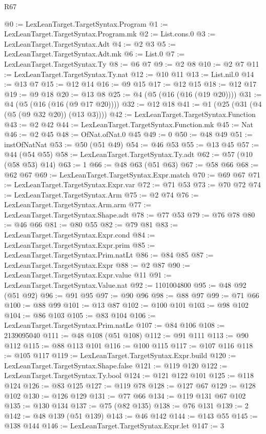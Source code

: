 \begin{lexlean}{R67}
\begin{coremodule}
@0 := LexLeanTarget.TargetSyntax.Program
@1 := LexLeanTarget.TargetSyntax.Program.mk
@2 := List.cons.{0}
@3 := LexLeanTarget.TargetSyntax.Adt
@4 := @2 @3
@5 := LexLeanTarget.TargetSyntax.Adt.mk
@6 := List.{0}
@7 := LexLeanTarget.TargetSyntax.Ty
@8 := @6 @7
@9 := @2 @8
@10 := @2 @7
@11 := LexLeanTarget.TargetSyntax.Ty.nat
@12 := @10 @11
@13 := List.nil.{0}
@14 := @13 @7
@15 := @12 @14
@16 := @9 @15
@17 := @12 @15
@18 := @12 @17
@19 := @9 @18
@20 := @13 @8
@25 := @4 (@5 (@16 (@16 (@19 @20))))
@31 := @4 (@5 (@16 (@16 (@9 @17 @20))))
@32 := @12 @18
@41 := @1 (@25 (@31 (@4 (@5 (@9 @32 @20)) (@13 @3))))
@42 := LexLeanTarget.TargetSyntax.Function
@43 := @2 @42
@44 := LexLeanTarget.TargetSyntax.Function.mk
@45 := Nat
@46 := @2 @45
@48 := OfNat.ofNat.{0} @45
@49 := 0
@50 := @48 @49
@51 := instOfNatNat
@53 := @50 (@51 @49)
@54 := @46 @53
@55 := @13 @45
@57 := @44 (@54 @55)
@58 := LexLeanTarget.TargetSyntax.Ty.adt
@62 := @57 (@10 (@58 @53) @14)
@63 := 1
@66 := @48 @63 (@51 @63)
@67 := @58 @66
@68 := @62 @67
@69 := LexLeanTarget.TargetSyntax.Expr.match
@70 := @69 @67
@71 := LexLeanTarget.TargetSyntax.Expr.var
@72 := @71 @53
@73 := @70 @72
@74 := LexLeanTarget.TargetSyntax.Arm
@75 := @2 @74
@76 := LexLeanTarget.TargetSyntax.Arm.arm
@77 := LexLeanTarget.TargetSyntax.Shape.adt
@78 := @77 @53
@79 := @76 @78
@80 := @46 @66
@81 := @80 @55
@82 := @79 @81
@83 := LexLeanTarget.TargetSyntax.Expr.cond
@84 := LexLeanTarget.TargetSyntax.Expr.prim
@85 := LexLeanTarget.TargetSyntax.Prim.natLt
@86 := @84 @85
@87 := LexLeanTarget.TargetSyntax.Expr
@88 := @2 @87
@90 := LexLeanTarget.TargetSyntax.Expr.value @11
@91 := LexLeanTarget.TargetSyntax.Value.nat
@92 := 1101004800
@95 := @48 @92 (@51 @92)
@96 := @91 @95
@97 := @90 @96
@98 := @88 @97
@99 := @71 @66
@100 := @88 @99
@101 := @13 @87
@102 := @100 @101
@103 := @98 @102
@104 := @86 @103
@105 := @83 @104
@106 := LexLeanTarget.TargetSyntax.Prim.natLe
@107 := @84 @106
@108 := 2139095040
@111 := @48 @108 (@51 @108)
@112 := @91 @111
@113 := @90 @112
@115 := @88 @113 @101
@116 := @100 @115
@117 := @107 @116
@118 := @105 @117
@119 := LexLeanTarget.TargetSyntax.Expr.build
@120 := LexLeanTarget.TargetSyntax.Shape.false
@121 := @119 @120
@122 := LexLeanTarget.TargetSyntax.Ty.bool
@124 := @121 @122 @101
@125 := @118 @124
@126 := @83 @125
@127 := @119 @78
@128 := @127 @67
@129 := @128 @102
@130 := @126 @129
@131 := @77 @66
@134 := @119 @131 @67 @102
@135 := @130 @134
@137 := @75 (@82 @135)
@138 := @76 @131
@139 := 2
@142 := @48 @139 (@51 @139)
@143 := @46 @142
@144 := @143 @55
@145 := @138 @144
@146 := LexLeanTarget.TargetSyntax.Expr.let
@147 := 3

\end{coremodule}
\end{lexlean}
